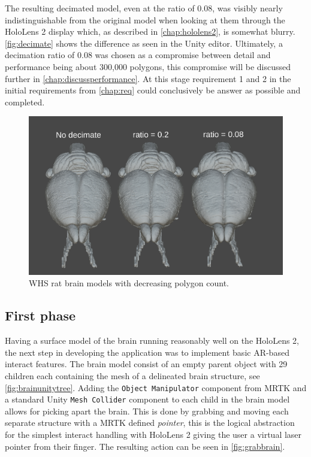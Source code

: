 The resulting decimated model, even at the ratio of 0.08, was visibly nearly indistinguishable from the original model when looking at them through the HoloLens 2 display which, as described in \autoref{chap:hololens2}, is somewhat blurry. \autoref{fig:decimate} shows the difference as seen in the Unity editor. Ultimately, a decimation ratio of 0.08 was chosen as a compromise between detail and performance being about 300,000 polygons, this compromise will be discussed further in \autoref{chap:discussperformance}. At this stage requirement 1 and 2 in the initial requirements from \autoref{chap:req} could conclusively be answer as possible and completed.
\begin{figure}[ht]
    \includegraphics[width=\textwidth]{fig/brainmodeldecimateratio2.png}
    \caption{WHS rat brain models with decreasing polygon count.}
    \label{fig:decimate}
\end{figure}



\subsection*{First phase}
Having a surface model of the brain running reasonably well on the HoloLens 2, the next step in developing the application was to implement basic AR-based interact features. The brain model consist of an empty parent object with 29 children each containing the mesh of a delineated brain structure, see \autoref{fig:brainunitytree}. Adding the \texttt{Object Manipulator} component from MRTK and a standard Unity \texttt{Mesh Collider} component to each child in the brain model allows for picking apart the brain. This is done by grabbing and moving each separate structure with a MRTK defined \textit{pointer}, this is the logical abstraction for the simplest interact handling with HoloLens 2 giving the user a virtual laser pointer from their finger. The resulting action can be seen in \autoref{fig:grabbrain}. 

